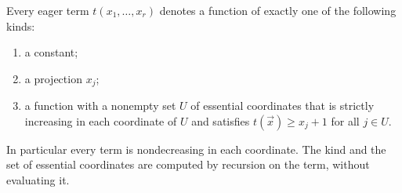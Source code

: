 \begin{theorem}\label{cert:thm:positive}
Every eager term $t(x_1,\dots,x_r)$ denotes a function of exactly one of the
following kinds:
\begin{enumerate}[label=(\roman*)]
\item a constant;
\item a projection $x_j$;
\item a function with a nonempty set $U$ of essential coordinates that is
strictly increasing in each coordinate of $U$ and satisfies
$t(\vec x)\ge x_j+1$ for all $j\in U$.
\end{enumerate}
In particular every term is nondecreasing in each coordinate. The kind and
the set of essential coordinates are computed by recursion on the term,
without evaluating it.
\end{theorem}

